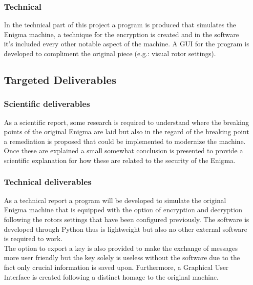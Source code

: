 \documentclass[conference,compsoc]{IEEEtran}
\begin{document}
\subsubsection{Technical}
In the technical part of this project a program is produced that simulates the Enigma machine, a technique for the encryption is created and in the software it's included every other notable aspect of the machine. A GUI for the program is developed to compliment the original piece (e.g.: visual rotor settings).

\subsection{Targeted Deliverables}
\label{sec-deliverables}
\subsubsection{Scientific deliverables}
As a scientific report, some research is required to understand where the breaking points of the original Enigma are laid but also in the regard of the breaking point a remediation is proposed that could be implemented to modernize the machine. Once these are explained a small somewhat conclusion is presented to provide a scientific explanation for how these are related to the security of the Enigma.

\subsubsection{Technical deliverables}
As a technical report a program will be developed to simulate the original Enigma machine that is equipped with the option of encryption and decryption following the rotors settings that have been configured previously. The software is developed through Python thus is lightweight but also no other external software is required to work. \\
The option to export a key is also provided to make the exchange of messages more user friendly but the key solely is useless without the software due to the fact only crucial information is saved upon. Furthermore, a Graphical User Interface is created following a distinct homage to the original machine.\\


\end{document}
